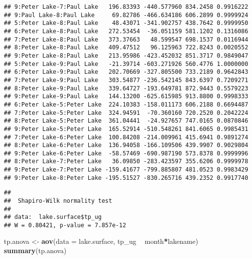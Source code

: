 \documentclass[]{article}
\newenvironment{Shaded}{\begin{snugshade}}{\end{snugshade}}
\newcommand{\CommentTok}[1]{\textcolor[rgb]{0.56,0.35,0.01}{\textit{#1}}}
\newcommand{\DataTypeTok}[1]{\textcolor[rgb]{0.13,0.29,0.53}{#1}}
\newcommand{\KeywordTok}[1]{\textcolor[rgb]{0.13,0.29,0.53}{\textbf{#1}}}
\newcommand{\NormalTok}[1]{#1}
\newcommand{\OperatorTok}[1]{\textcolor[rgb]{0.81,0.36,0.00}{\textbf{#1}}}
\newcommand{\StringTok}[1]{\textcolor[rgb]{0.31,0.60,0.02}{#1}}
\begin{document}
\begin{verbatim}
## 9:Peter Lake-7:Paul Lake   196.83393 -440.577960 834.2458 0.9916222
## 9:Paul Lake-8:Paul Lake     69.82786 -466.634186 606.2899 0.9999924
## 5:Peter Lake-8:Paul Lake    48.43071 -341.902757 438.7642 0.9999950
## 6:Peter Lake-8:Paul Lake   272.53454  -36.051159 581.1202 0.1316086
## 7:Peter Lake-8:Paul Lake   373.37663   48.599547 698.1537 0.0116944
## 8:Peter Lake-8:Paul Lake   409.47512   96.125963 722.8243 0.0020552
## 9:Peter Lake-8:Paul Lake   213.95986 -423.452032 851.3717 0.9849047
## 5:Peter Lake-9:Paul Lake   -21.39714 -603.271926 560.4776 1.0000000
## 6:Peter Lake-9:Paul Lake   202.70669 -327.805500 733.2189 0.9642843
## 7:Peter Lake-9:Paul Lake   303.54877 -236.542145 843.6397 0.7209271
## 8:Peter Lake-9:Paul Lake   339.64727 -193.649781 872.9443 0.5579223
## 9:Peter Lake-9:Paul Lake   144.13200 -625.615985 913.8800 0.9998333
## 6:Peter Lake-5:Peter Lake  224.10383 -158.011173 606.2188 0.6694487
## 7:Peter Lake-5:Peter Lake  324.94591  -70.360160 720.2520 0.2042224
## 8:Peter Lake-5:Peter Lake  361.04441  -24.927657 747.0165 0.0870846
## 9:Peter Lake-5:Peter Lake  165.52914 -510.548261 841.6065 0.9985431
## 7:Peter Lake-6:Peter Lake  100.84208 -214.009961 415.6941 0.9891274
## 8:Peter Lake-6:Peter Lake  136.94058 -166.109506 439.9907 0.9029804
## 9:Peter Lake-6:Peter Lake  -58.57469 -690.987190 573.8378 0.9999996
## 8:Peter Lake-7:Peter Lake   36.09850 -283.423597 355.6206 0.9999978
## 9:Peter Lake-7:Peter Lake -159.41677 -799.885807 481.0523 0.9983429
## 9:Peter Lake-8:Peter Lake -195.51527 -830.265716 439.2352 0.9917740
\end{verbatim}

\begin{Shaded}
\end{Shaded}

\begin{verbatim}
## 
##  Shapiro-Wilk normality test
## 
## data:  lake.surface$tp_ug
## W = 0.80421, p-value = 7.857e-12
\end{verbatim}

\begin{Shaded}
\begin{Highlighting}[]
\NormalTok{tp.anova <-}\StringTok{ }\KeywordTok{aov}\NormalTok{(}\DataTypeTok{data =}\NormalTok{ lake.surface, tp_ug }\OperatorTok{~}\StringTok{ }\NormalTok{month}\OperatorTok{*}\NormalTok{lakename)}
\KeywordTok{summary}\NormalTok{(tp.anova)}
\end{Highlighting}
\end{Shaded}
\end{document}

